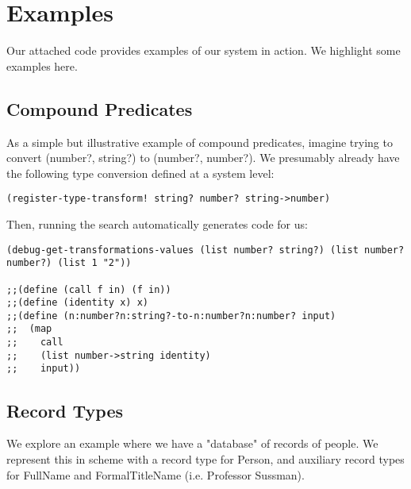 \documentclass[letterpaper]{article}
\begin{document}
\section{Examples}

Our attached code provides examples of our system in action. We highlight some examples here.

\subsection{Compound Predicates}

As a simple but illustrative example of compound predicates, imagine trying to convert (number?, string?) to (number?, number?). We presumably already have the following type conversion defined at a system level:

\begin{verbatim}
(register-type-transform! string? number? string->number)
\end{verbatim}

Then, running the search automatically generates code for us:
\begin{verbatim}
(debug-get-transformations-values (list number? string?) (list number? number?) (list 1 "2"))

;;(define (call f in) (f in))
;;(define (identity x) x)
;;(define (n:number?n:string?-to-n:number?n:number? input)
;;  (map 
;;    call 
;;    (list number->string identity) 
;;    input))
\end{verbatim}

\subsection{Record Types}
We explore an example where we have a "database" of records of people. We represent this in scheme with a record type for Person, and auxiliary record types for FullName and FormalTitleName (i.e. Professor Sussman).
\end{document}
